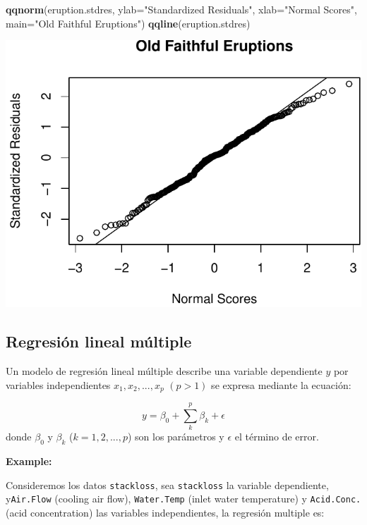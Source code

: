 \documentclass[]{article}
\newenvironment{Shaded}{\begin{snugshade}}{\end{snugshade}}
\newcommand{\KeywordTok}[1]{\textcolor[rgb]{0.13,0.29,0.53}{\textbf{{#1}}}}
\newcommand{\DataTypeTok}[1]{\textcolor[rgb]{0.13,0.29,0.53}{{#1}}}
\newcommand{\StringTok}[1]{\textcolor[rgb]{0.31,0.60,0.02}{{#1}}}
\newcommand{\NormalTok}[1]{{#1}}
\numberwithin{equation}{section}
\begin{document}
\begin{Shaded}
\begin{Highlighting}[]
 \KeywordTok{qqnorm}\NormalTok{(eruption.stdres, }
     \DataTypeTok{ylab=}\StringTok{"Standardized Residuals"}\NormalTok{, }
     \DataTypeTok{xlab=}\StringTok{"Normal Scores"}\NormalTok{, }
     \DataTypeTok{main=}\StringTok{"Old Faithful Eruptions"}\NormalTok{) }
 \KeywordTok{qqline}\NormalTok{(eruption.stdres) }
\end{Highlighting}
\end{Shaded}

\includegraphics{tema6_files/figure-latex/unnamed-chunk-28-1.pdf}

\subsection{Regresión lineal múltiple}\label{regresion-lineal-multiple}

Un modelo de regresión lineal múltiple describe una variable dependiente
\(y\) por variables independientes \(x_1, x_2, ..., x_p\) \((p> 1)\) se
expresa mediante la ecuación:

\[
    y  = \beta_0 + \sum_{k}^{p} \beta_k + \epsilon
\] donde \(\beta_0\) y \(\beta_k\) (\(k = 1, 2, ..., p\)) son los
parámetros y \(\epsilon\) el término de error.

\textbf{Example:}

Consideremos los datos \texttt{stackloss}, sea \texttt{stackloss} la
variable dependiente, y\texttt{Air.Flow} (cooling air flow),
\texttt{Water.Temp} (inlet water temperature) y \texttt{Acid.Conc.}
(acid concentration) las variables independientes, la regresión multiple
es:
\end{document}
